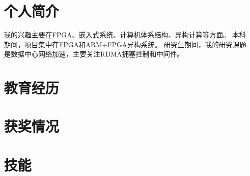 \documentclass[11pt,a4paper]{moderncv}
\begin{document}
	
	\renewcommand{\refname}{Publication}
	\maketitle
	
	\section{个人简介}
	\cvline{}
	{
		我的兴趣主要在FPGA、嵌入式系统、计算机体系结构、异构计算等方面。
		\newline
		本科期间，项目集中在FPGA和ARM+FPGA异构系统。
		\newline
		研究生期间，我的研究课题是数据中心网络加速，主要关注RDMA拥塞控制和中间件。
	}
	\section{教育经历}
	\section{获奖情况}
	\section{技能}
	
\end{document}
